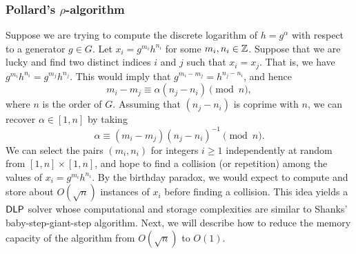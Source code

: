 \subsubsection{Pollard's $\rho$-algorithm}
Suppose we are trying to compute the discrete logarithm of $h = g^\alpha$ 
with respect to a generator $g \in G$. Let $x_i = g^{m_i} h^{n_i}$ for some 
$m_i, n_i \in \mathbb{Z}$. Suppose that we are lucky and find two distinct indices 
$i$ and $j$ such that $x_i = x_j$. That is, we have $g^{m_i} h^{n_i} 
= g^{m_j} h^{n_j}$. This would imply that $g^{m_i-m_j} = h^{n_j-n_i}$, and hence 
\[ m_i - m_j \equiv \alpha(n_j - n_i) \pmod n, \] 
where $n$ is the order of $G$. Assuming that $(n_j - n_i)$ is coprime with $n$, 
we can recover $\alpha \in [1, n]$ by taking 
\[ \alpha \equiv (m_i - m_j)(n_j - n_i)^{-1} \pmod n. \] 
We can select the pairs $(m_i, n_i)$ for integers $i \geq 1$ independently at 
random from $[1, n] \times [1, n]$, and hope to find a collision (or repetition) 
among the values of $x_i = g^{m_i} h^{n_i}$. By the birthday paradox, we would expect 
to compute and store about $O(\sqrt n)$ instances of $x_i$ before finding a 
collision. This idea yields a ${\sf DLP}$ solver whose computational and storage 
complexities are similar to Shanks' baby-step-giant-step algorithm. Next, 
we will describe how to reduce the memory capacity of the algorithm from 
$O(\sqrt n)$ to $O(1)$. 

